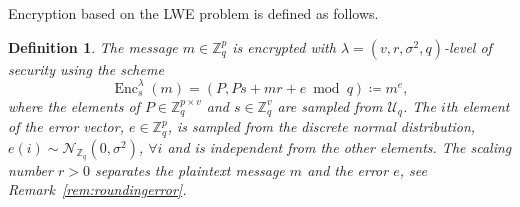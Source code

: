 \documentclass[journal, twoside, web]{ieeecolorpreprint}
\newtheorem{defi}{Definition}
\DeclareMathOperator{\enc}{Enc}
\begin{document}
Encryption based on the LWE problem is defined as follows.
\begin{defi}\label{def:lwe}
The message $m \in \mathbb Z_q^p$ is encrypted with $\lambda=(v,r,\sigma^2,q)$-level of security using the scheme
\begin{equation}\label{eq:lweencmsg}
    \enc^\lambda_s (m) = (P, Ps+mr+e \bmod q) \coloneqq m^e,
\end{equation}
where the elements of $P \in \mathbb{Z}_q^{p \times v}$ and $s\in \mathbb{Z}_q^v$ are sampled from $\mathcal{U}_q$. The $i$th element of the error vector, $e \in \mathbb{Z}_q^p$, is sampled from the discrete normal distribution, $e(i) \sim \mathcal{N}_{\mathbb{Z}_q}(0,\sigma^2)$, $\forall i$ and is independent from the other elements. The scaling number $r>0$ separates the plaintext message $m$ and the error $e$, see Remark~\ref{rem:roundingerror}.
\end{defi}

\end{document}
